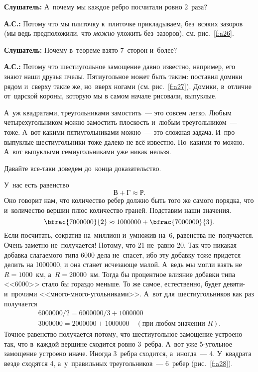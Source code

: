 \textbf{Слушатель:} А~почему мы каждое ребро посчитали ровно 2~раза?

\textbf{А.С.:} Потому что мы плиточку к~плиточке прикладываем, без~всяких зазоров (мы ведь
предположили, что \textit{можно} уложить без~зазоров), см. рис.~\ref{f:a26}.


\textbf{Слушатель:} Почему в~теореме взято 7~сторон и~более?

\textbf{А.С.:} Потому что шестиугольное замощение давно известно, например, его знают наши друзья
пчелы. Пятиугольное может быть таким: поставил домики рядом и~сверху такие же, но~вверх ногами
(см. рис.~\ref{f:a27}). Домики, в~отличие от~царской короны, которую мы в самом начале рисовали, выпуклые.


А~уж квадратами, треугольниками замостить~--- это совсем легко. Любым четырехугольником можно
замостить плоскость и~любым треугольником~--- тоже. А~вот какими пятиугольниками можно~--- это
сложная задача. И~про выпуклые шестиугольники тоже далеко не всё известно. Но~какими-то можно. А~вот выпуклыми
семиугольниками уже никак нельзя.



Давайте все-таки доведем до~конца доказательство.

У~нас есть равенство
$$
\text{В}+\text{Г}\approx \text{Р}.
$$
Оно говорит нам, что количество ребер должно быть того же самого порядка, что и~количество вершин
плюс количество граней. Подставим наши значения.
$$
\bfrac{7000000}{2}\approx 1000000+\bfrac{7000000}{3}.
$$
Если посчитать, сократив на~миллион и~умножив на~6, равенства не~получается. Очень заметно
не~получается! Потому, что 21 не~равно 20. Так что никакая добавка слагаемого типа 6000 дела
не~спасет, ибо эту добавку тоже придется делить на 1000000, и она станет исчезающе малой.
 А~ведь мы могли взять не~$R=1000$~км, а~$R=20000$~км. Тогда бы процентное влияние добавки
типа <<6000>> стало бы гораздо меньше. То же самое, естественно, будет  девяти- и~прочими
<<много-много-угольниками>>. А~вот для~шестиугольников как раз получается
\begin{gather*}
6 000 000/2=6 000 000/3 +1 000 000\\
3 000 000=2 000 000+1 000 000\quad
(\text{при~любом значении $R$}).
\end{gather*}
Точное равенство получается потому, что шестиугольное замощение устроено так, что в~каждой вершине
сходится ровно 3~ребра. А~вот уже 5-угольное замощение устроено иначе. Иногда 3~ребра сходится,
а~иногда~--- 4. У~квадрата везде сходятся 4, а~у~правильных треугольников~--- 6~ребер (рис.~\ref{f:a28}).

